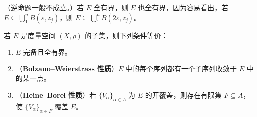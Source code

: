 \documentclass[../../main.tex]{subfiles}%
\begin{document}
\begin{remark}
（逆命题一般不成立。）若 $E$ 全有界，则 $\overline{E}$ 也全有界，因为容易看出，若 $E\subseteq\bigcup_1^nB(\varepsilon,z_j)$，则 $\overline{E}\subseteq\bigcup_1^nB(2\varepsilon,z_j)$。
\end{remark}


\begin{theorem}\label{theorem:ch00-compactness-characterization}
若 $E$ 是度量空间 $(X,\rho)$ 的子集，则下列条件等价：
\begin{enumerate}[label=\alph*.,ref=(\alph*)]
\item\label{item:ch00-compact-complete-total} $E$ 完备且全有界。
\item\label{item:ch00-compact-bolzano-weierstrass} （\textbf{Bolzano–Weierstrass 性质}）$E$ 中的每个序列都有一个子序列收敛于 $E$ 中的某一点。
\item\label{item:ch00-compact-heine-borel} （\textbf{Heine–Borel 性质}）若 $\{V_\alpha\}_{\alpha\in A}$ 为 $E$ 的开覆盖，则存在有限集 $F\subseteq A$，使 $\{V_\alpha\}_{\alpha\in F}$ 覆盖 $E$。
\end{enumerate}
\end{theorem}
\end{document}
